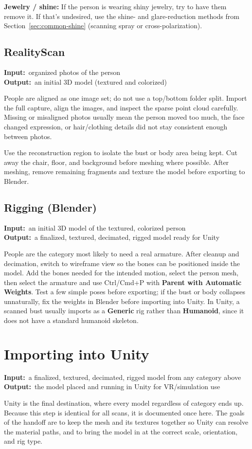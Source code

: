 \documentclass[11pt]{article}
\newcommand{\inout}[2]{%
    \begin{stageio}%
    \textbf{Input:}~#1\\[2pt]%
    \textbf{Output:}~#2%
    \end{stageio}%
}
\begin{document}
\textbf{Jewelry / shine:} If the person is wearing shiny jewelry, try to have them remove it. If that's undesired, use the shine- and glare-reduction methods from Section~\ref{sec:common-shine} (scanning spray or cross-polarization).

\subsection{RealityScan}
\inout{organized photos of the person}{an initial 3D model (textured and colorized)}
People are aligned as one image set; do not use a top/bottom folder split. Import the full capture, align the images, and inspect the sparse point cloud carefully. Missing or misaligned photos usually mean the person moved too much, the face changed expression, or hair/clothing details did not stay consistent enough between photos.

\noindent Use the reconstruction region to isolate the bust or body area being kept. Cut away the chair, floor, and background before meshing where possible. After meshing, remove remaining fragments and texture the model before exporting to Blender.

\subsection{Rigging (Blender)}
\inout{an initial 3D model of the textured, colorized person}{a finalized, textured, decimated, rigged model ready for Unity}
People are the category most likely to need a real armature. After cleanup and decimation, switch to wireframe view so the bones can be positioned inside the model. Add the bones needed for the intended motion, select the person mesh, then select the armature and use Ctrl/Cmd+P with \textbf{Parent with Automatic Weights}. Test a few simple poses before exporting; if the bust or body collapses unnaturally, fix the weights in Blender before importing into Unity. In Unity, a scanned bust usually imports as a \textbf{Generic} rig rather than \textbf{Humanoid}, since it does not have a standard humanoid skeleton.

\section{Importing into Unity}
\inout{a finalized, textured, decimated, rigged model from any category above}{the model placed and running in Unity for VR/simulation use}
Unity is the final destination, where every model regardless of category ends up. Because this step is identical for all scans, it is documented once here. The goals of the handoff are to keep the mesh and its textures together so Unity can resolve the material paths, and to bring the model in at the correct scale, orientation, and rig type.
\end{document}
